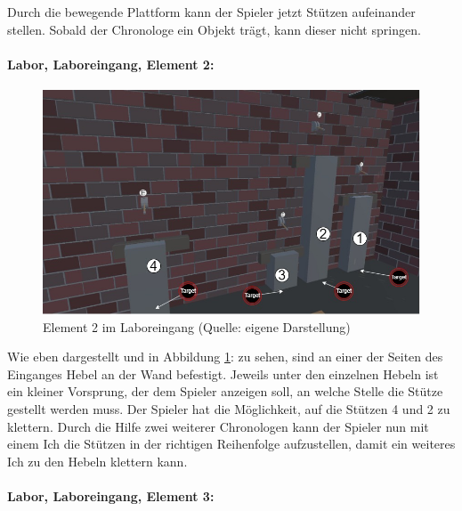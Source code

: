 Durch die bewegende Plattform kann der Spieler jetzt Stützen aufeinander stellen. Sobald der Chronologe ein Objekt trägt, kann dieser nicht springen.

\paragraph{Labor, Laboreingang, Element 2:}\label{p:lle2}

\begin{figure}[ht]
\centering
\includegraphics[width=0.8\linewidth]{content/pictures/Raetsel-L02_R02_R02.jpg}
\caption{Element 2 im Laboreingang (Quelle: eigene Darstellung)}
\label{fig:L02_R02_R02}
\end{figure}

Wie eben dargestellt und in Abbildung \ref{fig:L02_R02_R02}:  zu sehen, sind an einer der Seiten des Einganges Hebel an der Wand befestigt. Jeweils unter den einzelnen Hebeln ist ein kleiner Vorsprung, der dem Spieler anzeigen soll, an welche Stelle die Stütze gestellt werden muss. Der Spieler hat die Möglichkeit, auf die Stützen 4 und 2 zu klettern. Durch die Hilfe zwei weiterer Chronologen kann der Spieler nun mit einem Ich die Stützen in der richtigen Reihenfolge aufzustellen, damit ein weiteres Ich zu den Hebeln klettern kann.

\paragraph{Labor, Laboreingang, Element 3:}\label{p:lle3}

